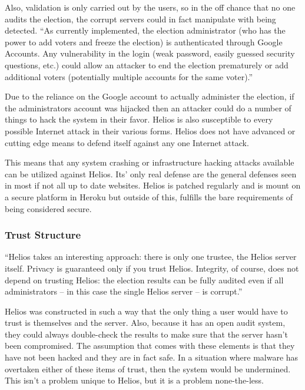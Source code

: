 Also, validation is only carried out by the users, so in the off
chance that no one audits the election, the corrupt servers could in
fact manipulate with being detected. ``As currently implemented, the
election administrator (who has the power to add voters and freeze the
election) is authenticated through Google Accounts. Any vulnerability
in the login (weak password, easily guessed security questions, etc.)
could allow an attacker to end the election prematurely or add
additional voters (potentially multiple accounts for the same
voter).''~\cite{orion2009}

Due to the reliance on the Google account to actually administer the
election, if the administrators account was hijacked then an attacker
could do a number of things to hack the system in their favor. Helios
is also susceptible to every possible Internet attack in their various
forms. Helios does not have advanced or cutting edge means to defend
itself against any one Internet attack.

This means that any system crashing or infrastructure hacking attacks
available can be utilized against Helios. Its' only real defense are
the general defenses seen in most if not all up to date
websites. Helios is patched regularly and is mount on a secure
platform in Heroku but outside of this, fulfills the bare requirements
of being considered secure.

\subsubsection{Trust Structure}

``Helios takes an interesting approach: there is only one trustee, the
Helios server itself. Privacy is guaranteed only if you trust
Helios. Integrity, of course, does not depend on trusting Helios: the
election results can be fully audited even if all administrators -- in
this case the single Helios server -- is corrupt.''~\cite{adida2008}

Helios was constructed in such a way that the only thing a user would
have to trust is themselves and the server. Also, because it has an
open audit system, they could always double-check the results to make
sure that the server hasn't been compromised. The assumption that
comes with these elements is that they have not been hacked and they
are in fact safe. In a situation where malware has overtaken either of
these items of trust, then the system would be undermined. This isn't
a problem unique to Helios, but it is a problem none-the-less.

